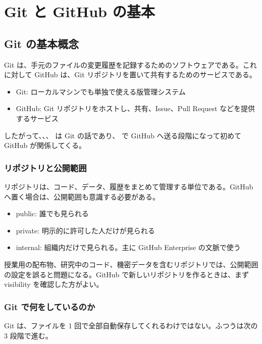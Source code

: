 \chapter{Git と GitHub の基本}
\label{app:git}

\section{Git の基本概念}

Git は、手元のファイルの変更履歴を記録するためのソフトウェアである。これに対して GitHub は、Git リポジトリを置いて共有するためのサービスである。

\begin{itemize}
\item Git: ローカルマシンでも単独で使える版管理システム
\item GitHub: Git リポジトリをホストし、共有、Issue、Pull Request などを提供するサービス
\end{itemize}

したがって、、、 は Git の話であり、 で GitHub へ送る段階になって初めて GitHub が関係してくる。

\subsection{リポジトリと公開範囲}

リポジトリは、コード、データ、履歴をまとめて管理する単位である。GitHub へ置く場合は、公開範囲も意識する必要がある。

\begin{itemize}
\item public: 誰でも見られる
\item private: 明示的に許可した人だけが見られる
\item internal: 組織内だけで見られる。主に GitHub Enterprise の文脈で使う
\end{itemize}

授業用の配布物、研究中のコード、機密データを含むリポジトリでは、公開範囲の設定を誤ると問題になる。GitHub で新しいリポジトリを作るときは、まず visibility を確認した方がよい。

\subsection{Git で何をしているのか}

Git は、ファイルを 1 回で全部自動保存してくれるわけではない。ふつうは次の 3 段階で進む。

